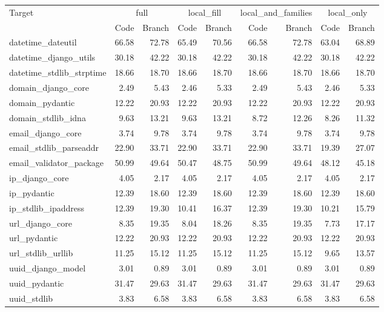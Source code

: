 \begin{tabular}{lrrrrrrrr}
\toprule
Target & \multicolumn{2}{c}{full} & \multicolumn{2}{c}{local\_fill} & \multicolumn{2}{c}{local\_and\_families} & \multicolumn{2}{c}{local\_only} \\
 & Code & Branch & Code & Branch & Code & Branch & Code & Branch \\
\midrule
datetime\_dateutil & 66.58 & 72.78 & 65.49 & 70.56 & 66.58 & 72.78 & 63.04 & 68.89 \\
datetime\_django\_utils & 30.18 & 42.22 & 30.18 & 42.22 & 30.18 & 42.22 & 30.18 & 42.22 \\
datetime\_stdlib\_strptime & 18.66 & 18.70 & 18.66 & 18.70 & 18.66 & 18.70 & 18.66 & 18.70 \\
domain\_django\_core & 2.49 & 5.43 & 2.46 & 5.33 & 2.49 & 5.43 & 2.46 & 5.33 \\
domain\_pydantic & 12.22 & 20.93 & 12.22 & 20.93 & 12.22 & 20.93 & 12.22 & 20.93 \\
domain\_stdlib\_idna & 9.63 & 13.21 & 9.63 & 13.21 & 8.72 & 12.26 & 8.26 & 11.32 \\
email\_django\_core & 3.74 & 9.78 & 3.74 & 9.78 & 3.74 & 9.78 & 3.74 & 9.78 \\
email\_stdlib\_parseaddr & 22.90 & 33.71 & 22.90 & 33.71 & 22.90 & 33.71 & 19.39 & 27.07 \\
email\_validator\_package & 50.99 & 49.64 & 50.47 & 48.75 & 50.99 & 49.64 & 48.12 & 45.18 \\
ip\_django\_core & 4.05 & 2.17 & 4.05 & 2.17 & 4.05 & 2.17 & 4.05 & 2.17 \\
ip\_pydantic & 12.39 & 18.60 & 12.39 & 18.60 & 12.39 & 18.60 & 12.39 & 18.60 \\
ip\_stdlib\_ipaddress & 12.39 & 19.30 & 10.41 & 16.37 & 12.39 & 19.30 & 10.21 & 15.79 \\
url\_django\_core & 8.35 & 19.35 & 8.04 & 18.26 & 8.35 & 19.35 & 7.73 & 17.17 \\
url\_pydantic & 12.22 & 20.93 & 12.22 & 20.93 & 12.22 & 20.93 & 12.22 & 20.93 \\
url\_stdlib\_urllib & 11.25 & 15.12 & 11.25 & 15.12 & 11.25 & 15.12 & 9.65 & 13.57 \\
uuid\_django\_model & 3.01 & 0.89 & 3.01 & 0.89 & 3.01 & 0.89 & 3.01 & 0.89 \\
uuid\_pydantic & 31.47 & 29.63 & 31.47 & 29.63 & 31.47 & 29.63 & 31.47 & 29.63 \\
uuid\_stdlib & 3.83 & 6.58 & 3.83 & 6.58 & 3.83 & 6.58 & 3.83 & 6.58 \\
\bottomrule
\end{tabular}
